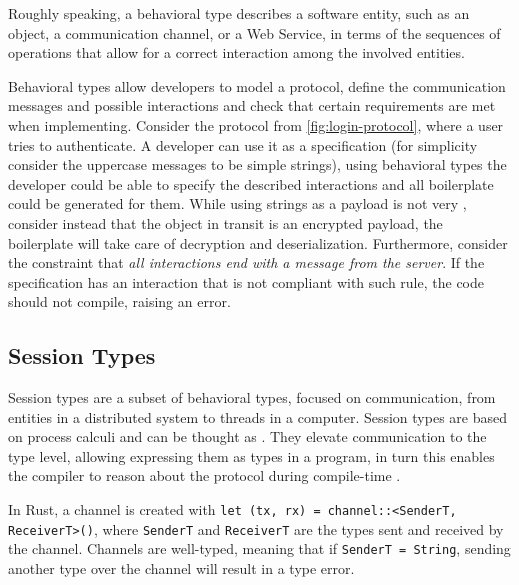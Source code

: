 \begin{displayquote}
    Roughly speaking, a behavioral type describes a software entity, such as an object, a communication channel,
    or a Web Service, in terms of the sequences of operations that allow for a correct interaction among the involved entities.
\end{displayquote}

Behavioral types allow developers to model a protocol,
define the communication messages and possible interactions and
check that certain requirements are met when implementing.
Consider the protocol from \autoref{fig:login-protocol},
where a user tries to authenticate.
A developer can use it as a specification
(for simplicity consider the uppercase messages to be simple strings),
using behavioral types the developer could be able to specify the described interactions and all boilerplate could be generated for them.
While using strings as a payload is not very ,
consider instead that the object in transit is an encrypted payload,
the boilerplate will take care of decryption and deserialization.
Furthermore, consider the constraint that \emph{all interactions end with a message from the server}.
If the specification has an interaction that is not compliant with such rule,
the code should not compile, raising an error.



\subsection{Session Types}

Session types are a subset of behavioral types, focused on communication,
from entities in a distributed system to threads in a computer.
Session types are based on process calculi and can be thought as  \autocite{Honda1993, Honda1998}.
They elevate communication to the type level, allowing expressing them as types in a program,
in turn this enables the compiler to reason about the protocol during compile-time \autocite{Gay2015, Vasconcelos2006}.

In Rust, a channel is created with \texttt{let (tx, rx) = channel::<SenderT, ReceiverT>()},
where \texttt{SenderT} and \texttt{ReceiverT} are the types sent and received by the channel.
Channels are well-typed, meaning that if \texttt{SenderT = String},
sending another type over the channel will result in a type error.

